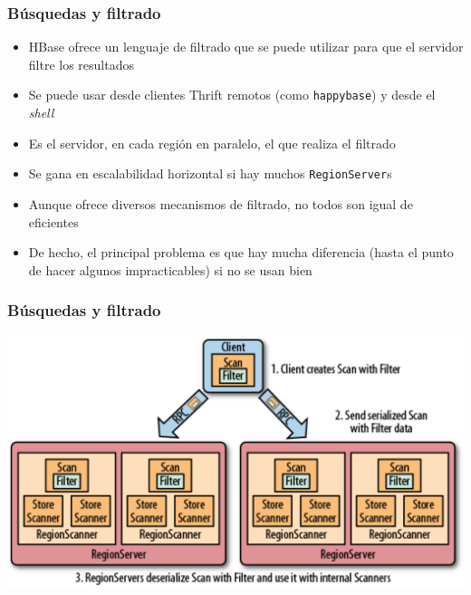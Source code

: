 \documentclass[14pt]{beamer}
\begin{document}
\begin{frame}
  \frametitle{Búsquedas y filtrado}
\begin{itemize}
\item HBase ofrece un lenguaje de filtrado que se puede utilizar para que
  el servidor filtre los resultados
\item Se puede usar desde clientes Thrift remotos (como {\tt happybase}) y
  desde el {\em shell}
\item Es el servidor, en cada región en paralelo, el que realiza el
  filtrado
\item Se gana en escalabilidad horizontal si hay muchos {\tt RegionServer}s
\item Aunque ofrece diversos mecanismos de filtrado, no todos son igual de
  eficientes
\item De hecho, el principal problema es que hay mucha diferencia (hasta el
  punto de hacer algunos impracticables) si no se usan bien
\end{itemize}
\end{frame}

\begin{frame}
  \frametitle{Búsquedas y filtrado}
  \includegraphics[width=\textwidth]{img/filter-region-server}
\end{frame}
\end{document}
